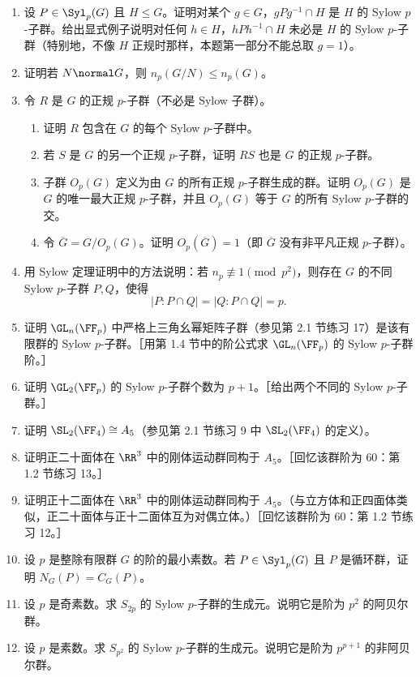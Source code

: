 \begin{enumerate}[label=\arabic*.]
  \item 设 $P\in\Syl_p(G)$ 且 $H\leq G$。证明对某个 $g\in G$，$gPg^{-1}\cap H$ 是 $H$ 的 Sylow $p$-子群。给出显式例子说明对任何 $h\in H$，$hPh^{-1}\cap H$ 未必是 $H$ 的 Sylow $p$-子群（特别地，不像 $H$ 正规时那样，本题第一部分不能总取 $g=1$）。
  \item 证明若 $N\normal G$，则 $n_p(G/N)\leq n_p(G)$。
  \item 令 $R$ 是 $G$ 的正规 $p$-子群（不必是 Sylow 子群）。
  \begin{enumerate}[label=(\alph*)]
    \item 证明 $R$ 包含在 $G$ 的每个 Sylow $p$-子群中。
    \item 若 $S$ 是 $G$ 的另一个正规 $p$-子群，证明 $RS$ 也是 $G$ 的正规 $p$-子群。
    \item 子群 $O_p(G)$ 定义为由 $G$ 的所有正规 $p$-子群生成的群。证明 $O_p(G)$ 是 $G$ 的唯一最大正规 $p$-子群，并且 $O_p(G)$ 等于 $G$ 的所有 Sylow $p$-子群的交。
    \item 令 $\overline G=G/O_p(G)$。证明 $O_p(\overline G)=1$（即 $\overline G$ 没有非平凡正规 $p$-子群）。
  \end{enumerate}
  \item 用 Sylow 定理证明中的方法说明：若 $n_p\not\equiv1\pmod{p^2}$，则存在 $G$ 的不同 Sylow $p$-子群 $P,Q$，使得
  \[
    |P:P\cap Q|=|Q:P\cap Q|=p.
  \]
  \item 证明 $\GL_n(\FF_p)$ 中严格上三角幺幂矩阵子群（参见第 2.1 节练习 17）是该有限群的 Sylow $p$-子群。［用第 1.4 节中的阶公式求 $\GL_n(\FF_p)$ 的 Sylow $p$-子群阶。］
  \item 证明 $\GL_2(\FF_p)$ 的 Sylow $p$-子群个数为 $p+1$。［给出两个不同的 Sylow $p$-子群。］
  \item 证明 $\SL_2(\FF_4)\cong A_5$（参见第 2.1 节练习 9 中 $\SL_2(\FF_4)$ 的定义）。
  \item 证明正二十面体在 $\RR^3$ 中的刚体运动群同构于 $A_5$。［回忆该群阶为 $60$：第 1.2 节练习 13。］
  \item 证明正十二面体在 $\RR^3$ 中的刚体运动群同构于 $A_5$。（与立方体和正四面体类似，正二十面体与正十二面体互为对偶立体。）［回忆该群阶为 $60$：第 1.2 节练习 12。］
  \item 设 $p$ 是整除有限群 $G$ 的阶的最小素数。若 $P\in\Syl_p(G)$ 且 $P$ 是循环群，证明 $N_G(P)=C_G(P)$。
  \item 设 $p$ 是奇素数。求 $S_{2p}$ 的 Sylow $p$-子群的生成元。说明它是阶为 $p^2$ 的阿贝尔群。
  \item 设 $p$ 是素数。求 $S_{p^2}$ 的 Sylow $p$-子群的生成元。说明它是阶为 $p^{p+1}$ 的非阿贝尔群。

\end{enumerate}
